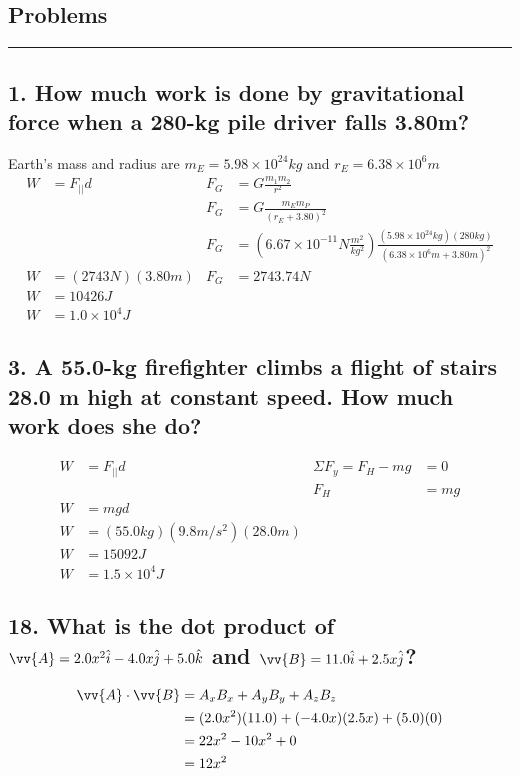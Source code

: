 \documentclass[12pt,a4paper,english]{article}
\begin{document}
\begin{flushleft}
  \section*{Problems}
  \hrule
  \subsection{1. How much work is done by gravitational force when a 280-kg pile driver falls 3.80m?}
Earth's mass and radius are $m_E=5.98\times10^{24}kg$ and $r_E=6.38\times10^6m$
  \begin{align*}
    W&=F_{||}d
     &
    F_G&=G\frac{m_1m_2}{r^2} 
    \\
     &
     &
    F_G&=G\frac{m_Em_P}{(r_E+3.80)^2} 
    \\
     &
     &
    F_G&=(6.67\times10^{-11}N\frac{m^2}{kg^2})\frac{(5.98\times10^{24}kg)(280kg)}{(6.38\times10^6m+3.80m)^2} 
    \\
    W&=(2743N)(3.80m)
     &
    F_G&=2743.74N
    \\
    W&=10426J
    \\
    W&=1.0\times10^4J
  \end{align*}
  \subsection{3. A 55.0-kg firefighter climbs a flight of stairs 28.0 m high at constant speed. How much work does she do?}
  \begin{align*}
    W&=F_{||}d
     &
    \Sigma F_y=F_H-mg
     &=0
     \\
     &
     &
  F_H&=mg
     \\
  W&=mgd
  \\
  W&=(55.0kg)(9.8m/s^2)(28.0m)
  \\
  W&=15092J
  \\
  W&=1.5\times10^{4}J
  \end{align*}
  \subsection{18. What is the dot product of $\vv{A}=2.0x^2\hat{i}-4.0x\hat{j}+5.0\hat{k}$ and $\vv{B}=11.0\hat{i}+2.5x\hat{j}$?}
  \begin{align*}
    \vv{A}\cdot\vv{B}&=A_xB_x+A_yB_y+A_zB_z
    \\
                     &=(2.0x^2)(11.0)+(-4.0x)(2.5x)+(5.0)(0)
                     \\
                     &=22x^2-10x^2+0
                     \\
                     &=12x^2
  \end{align*}

\end{flushleft}
\end{document}
